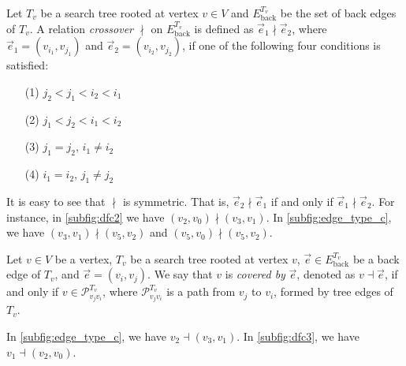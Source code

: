 \begin{definition}
Let $T_v$ be a search tree rooted at vertex $v\in V$ and $E_{\text{back}}^{T_v}$ be the set of back edges of $T_v$. A relation \emph{crossover} $\nmid$ on $E_{\text{back}}^{T_v}$ is defined as $\vec{e}_1 \nmid \vec{e}_2$, where $\vec{e}_1 = (v_{i_1}, v_{j_1})$ and $\vec{e}_2=(v_{i_2}, v_{j_2})$,
if one of the following four conditions is satisfied:
\begin{enumerate}
    \item[(1)]  $j_2 < j_1 < i_2 < i_1$
    \item[(2)]  $j_1 < j_2 < i_1 < i_2$
    \item[(3)]  $j_1 = j_2\text{, }i_1 \neq i_2$
    \item[(4)]  $i_1 = i_2\text{, }j_1 \neq j_2$
\end{enumerate}
\end{definition}
It is easy to see that $\nmid$ is symmetric. That is, $\vec{e}_2 \nmid \vec{e}_1$  if and only if $\vec{e}_1 \nmid \vec{e}_2$. For instance, in \cref{subfig:dfc2} we have $(v_2,v_0)\nmid (v_3,v_1)$. In \cref{subfig:edge_type_c}, we have $(v_3,v_1)\nmid (v_5,v_2)$ and $(v_5,v_0)\nmid (v_5,v_2)$. 



\begin{definition}
Let $v\in V$ be a vertex, $T_v$ be a search tree rooted at vertex $v$, $\vec{e} \in E_{\text{back}}^{T_v}$ be a back edge of $T_v$, and $\vec{e} = (v_{i}, v_{j})$. We say that $v$ is \emph{covered by} $\vec{e}$, denoted as $v \dashv \vec{e}$,
if and only if  $v \in \mathcal{P}^{T_v}_{v_jv_i}$, where $\mathcal{P}^{T_v}_{v_jv_i}$ is a path from $v_j$ to $v_i$, formed by tree edges of $T_v$.
\end{definition}
In \cref{subfig:edge_type_c}, we have $v_2 \dashv(v_3,v_1)$. In \cref{subfig:dfc3}, we have $v_1 \dashv (v_2, v_0)$. 


